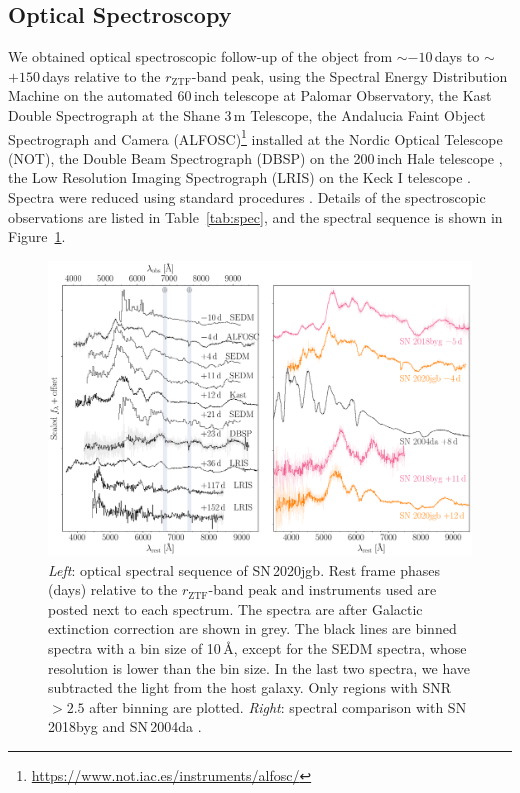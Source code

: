 \documentclass[twocolumn]{aastex631}
\newcommand{\sn}{SN\,2020jgb}
\begin{document}
\subsection{Optical Spectroscopy}\label{sec:optical_spec}
We obtained optical spectroscopic follow-up of the object from $\sim$$-10$\,days to $\sim$$+150$\,days relative to the $r_\mathrm{ZTF}$-band peak, using the Spectral Energy Distribution Machine \citep[SEDM;][]{SEDM_2018} on the automated 60\,inch telescope \citep[P60;][]{P60_2006} at Palomar Observatory, the Kast Double Spectrograph \citep{miller1994kast} at the Shane 3\,m Telescope, the Andalucia Faint Object Spectrograph and Camera (ALFOSC)\footnote{\url{https://www.not.iac.es/instruments/alfosc/}} installed at the Nordic Optical Telescope (NOT), the Double Beam Spectrograph (DBSP) on the 200\,inch Hale telescope \citep[P200;][]{P200_1982}, the Low Resolution Imaging Spectrograph (LRIS) on the Keck I telescope \citep{Keck_1995}. Spectra were reduced using standard procedures \citep[e.g.,][]{Matheson_2000}. Details of the spectroscopic observations are listed in Table~\ref{tab:spec}, and the spectral sequence is shown in Figure~\ref{fig:spec_evo}.


\begin{figure}
    \centering
    \includegraphics[width=\textwidth]{optical_spec_evolution.pdf}
    \caption{\textit{Left}: optical spectral sequence of \sn. Rest frame phases (days) relative to the $r_\mathrm{ZTF}$-band peak and instruments used are posted next to each spectrum. The spectra are after Galactic extinction correction are shown in grey. The black lines are binned spectra with a bin size of 10\,\r{A}, except for the SEDM spectra, whose resolution is lower than the bin size. In the last two spectra, we have subtracted the light from the host galaxy. Only regions with SNR $>2.5$ after binning are plotted. 
    \textit{Right}: spectral comparison with SN\,2018byg \citep[sub-luminous He-shell DDet;][]{de_18byg_2019} and SN\,2004da \citep[normal luminosity;][]{Silverman_2012}.}
    \label{fig:spec_evo}
\end{figure}
\end{document}
